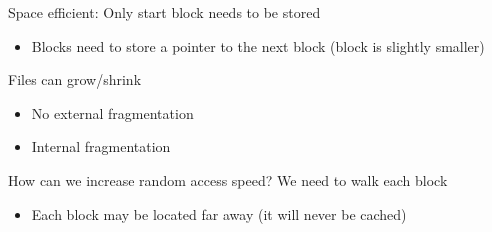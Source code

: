 \begin{slide}
    
    
    Space efficient: Only start block needs to be stored
	\begin{itemize}
		\item Blocks need to store a pointer to the next block (block is slightly smaller)
	\end{itemize}
    \bigskip

    Files can grow/shrink
	\begin{itemize}
		\item No external fragmentation
		\item Internal fragmentation
	\end{itemize}
	\bigskip

    How can we increase random access speed? We need to walk each block
	\begin{itemize}
		\item Each block may be located far away (it will never be cached)
	\end{itemize}

\end{slide}

